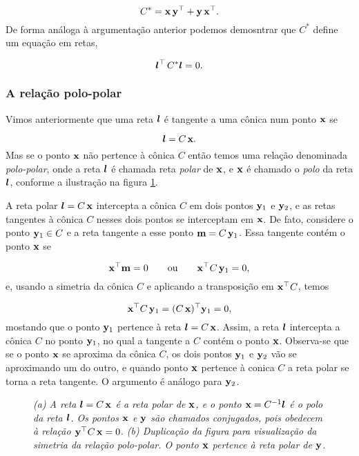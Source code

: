 \begin{equation*}
C^*=\mathbf{x}\,{\bf y}^\top+{\bf y}\,\mathbf{x}^\top.
\end{equation*}
De forma análoga à argumentação anterior podemos demosntrar que $C^*$ define um equação em retas,

\begin{equation*}
\boldsymbol{l}^\top\,C^*\boldsymbol{l}=0.
\end{equation*}

\subsubsection{A relação polo-polar}\label{sec.polo-polar}

Vimos anteriormente que uma reta $\boldsymbol{l}$ é tangente a uma cônica num ponto $\mathbf{x}$ se 

\begin{equation*}
\boldsymbol{l}=C\,\mathbf{x}.
\end{equation*}
Mas se o ponto $\mathbf{x}$ não pertence à cônica $C$ então temos uma relação denominada \textit{polo-polar}, onde a reta $\boldsymbol{l}$ é chamada reta \textit{polar} de $\mathbf{x}$, e $\mathbf{x}$ é chamado o \textit{polo} da reta $\boldsymbol{l}$, conforme a ilustração na figura \ref{fig.polo-polar}.

A reta polar $\boldsymbol{l}=C\,\mathbf{x}$ intercepta a cônica 
$C$ em dois pontos ${\bf y}_1$ e ${\bf y}_2$, e as retas tangentes à cônica $C$ nesses dois pontos se interceptam em $\mathbf{x}$. De fato, considere o ponto ${\bf y}_1 \in C$ e a reta tangente a esse ponto ${\bf m}=C\,{\bf y}_1$. Essa tangente contém o ponto $\mathbf{x}$ se 

\begin{equation*}
\mathbf{x}^\top{\bf m}=0\qquad\text{ou}\qquad\mathbf{x}^\top C\,{\bf y}_1=0,
\end{equation*}  
e, usando a simetria da cônica $C$ e aplicando a transposição em $\mathbf{x}^\top C$, temos

\begin{equation*}
\mathbf{x}^\top C\,{\bf y}_1=(C\,\mathbf{x})^\top{\bf y}_1=0,
\end{equation*}
mostando que o ponto ${\bf y}_1$ pertence à reta $\boldsymbol{l}=C\,\mathbf{x}$. Assim, a reta $\boldsymbol{l}$ intercepta a cônica $C$ no ponto ${\bf y}_1$, no qual a tangente a $C$ contém o ponto $\mathbf{x}$. Observa-se que se o ponto $\mathbf{x}$ se aproxima da cônica $C$, os dois pontos ${\bf y}_1$ e ${\bf y}_2$ vão se aproximando um do outro, e quando ponto $\mathbf{x}$ pertence à conica $C$ a reta polar se torna a reta tangente. O argumento é análogo para ${\bf y}_2$.\\


\begin{figure}[!htb]
\centering
{}
\quad
{}
\caption{\textit{(a) A reta $\boldsymbol{l}=C\,\mathbf{x}$ é a reta polar de $\mathbf{x}$, e o ponto $\mathbf{x}=C^{-1}\boldsymbol{l}$ é o polo da reta $\boldsymbol{l}$. Os pontos $\mathbf{x}$ e ${\bf y}$ são chamados conjugados, pois obedecem à relação ${\bf y}^\top C\,\mathbf{x}=0$. (b) Duplicação da figura para visualização da simetria da relação polo-polar. O ponto $\mathbf{x}$ pertence à reta polar de ${\bf y}$.}}
\label{fig.polo-polar}
\end{figure}






